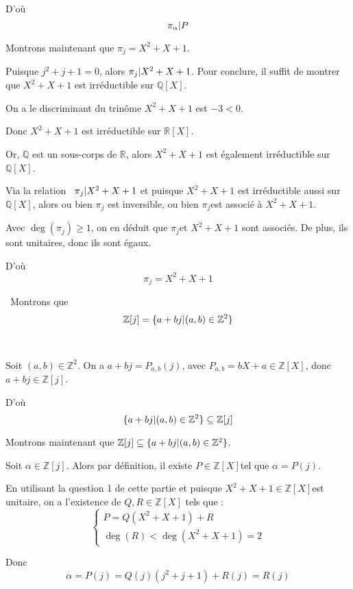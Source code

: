 D'o{\`u}
\[ \pi_{\alpha} | P  \]


Montrons maintenant que $\pi_j = X^2 + X + 1$.

Puisque $j^2 + j + 1 = 0$, alors $\pi_j | X^2 + X + 1 $. Pour
conclure, il suffit de montrer que $X^2 + X + 1$ est irr{\'e}ductible sur
$\mathbb{Q} [X]$.

On a le discriminant du trin{\^o}me $X^2 + X + 1$ est $- 3 < 0$.

Donc $X^2 + X + 1$ est irr{\'e}ductible sur $\mathbb{R} [X]$.

Or, $\mathbb{Q}$ est un sous-corps de $\mathbb{R}$, alors $X^2 + X + 1$ est
{\'e}galement irr{\'e}ductible sur $\mathbb{Q} [X]$.

Via la relation \ $\pi_j | X^2 + X + 1 $ et puisque $X^2 + X + 1$
est irr{\'e}ductible aussi sur $\mathbb{Q} [X]$, alors ou bien $\pi_j$ est
inversible, ou bien $\pi_j $est associ{\'e} {\`a} $X^2 + X + 1$.

Avec $\deg (\pi_j) \geqslant 1$, on en d{\'e}duit que $\pi_j $et $X^2 + X + 1$
sont associ{\'e}s. De plus, ils sont unitaires, donc ils sont {\'e}gaux.

D'o{\`u}
\[ \pi_j = X^2 + X + 1 \]


 \ Montrons que
\[ \mathbb{Z} [j] = \{ a + b j |   (a, b) \in \mathbb{Z}^2 \}
\]

\

Soit $(a, b) \in \mathbb{Z}^2$. On a $a + b j = P_{a, b} (j)$, avec $P_{a, b}
= b X + a \in \mathbb{Z} [X]$, donc $a + b j \in \mathbb{Z} [j]$.

D'o{\`u}
\[ \{ a + b j |   (a, b) \in \mathbb{Z}^2 \} \subseteq \mathbb{Z}
   [j] \]


Montrons maintenant que $\mathbb{Z} [j] \subseteq \{ a + b j |   (a,
b) \in \mathbb{Z}^2 \}$.

Soit $\alpha \in \mathbb{Z} [j]$. Alors par d{\'e}finition, il existe $P \in
\mathbb{Z} [X] $tel que $\alpha = P (j)$.

En utilisant la question 1 de cette partie et puisque $X^2 + X + 1 \in
\mathbb{Z} [X]$est unitaire, on a l'existence de $Q, R \in \mathbb{Z} [X]$
tels que :
\[ \left\{\begin{array}{l}
     P = Q (X^2 + X + 1) + R\\
     \deg (R) < \deg (X^2 + X + 1) = 2
   \end{array}\right. \]


Donc
\[ \alpha = P (j) = Q (j) (j^2 + j + 1) + R (j) = R (j) \]


